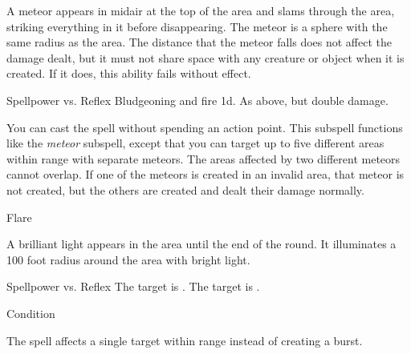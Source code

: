 \begin{spellcontent}
\begin{augmenttargetinginfo}
\end{augmenttargetinginfo}
\begin{augmenteffects}
\spelleffect
A meteor appears in midair at the top of the area and slams through the area, striking everything in it before disappearing.
The meteor is a sphere with the same radius as the area.
The distance that the meteor falls does not affect the damage dealt, but it must not share space with any creature or object when it is created.
If it does, this ability fails without effect.
\begin{spellattack}{Spellpower vs. Reflex}
\spellsuccess Bludgeoning and fire  \minus1d.
\spellcritical As above, but double damage.
\end{spellattack}
\end{augmenteffects}
\end{spellcontent}
You can cast the spell without spending an action point.
This subspell functions like the \textit{meteor} subspell, except that you can target up to five different areas within range with separate meteors.
The areas affected by two different meteors cannot overlap.
If one of the meteors is created in an invalid area, that meteor is not created, but the others are created and dealt their damage normally.
\begin{spellsection}{Flare}
\begin{spellcontent}
\begin{spelltargetinginfo}
\end{spelltargetinginfo}
\begin{spelleffects}
\spelleffect
A brilliant light appears in the area until the end of the round.
It illuminates a 100 foot radius around the area with bright light.
\begin{spellattack}{Spellpower vs. Reflex}
\spellsuccess
The target is \dazzled.
\spellcritical
The target is \blinded.
\end{spellattack}
\spelldur Condition
\end{spelleffects}
\end{spellcontent}
\begin{spellfooter}
\end{spellfooter}
\begin{spellsubcontent}
\begin{spellcantrip}
The spell affects a single target within range instead of creating a burst.
\end{spellcantrip}
\end{spellsubcontent}
\end{spellsection}
